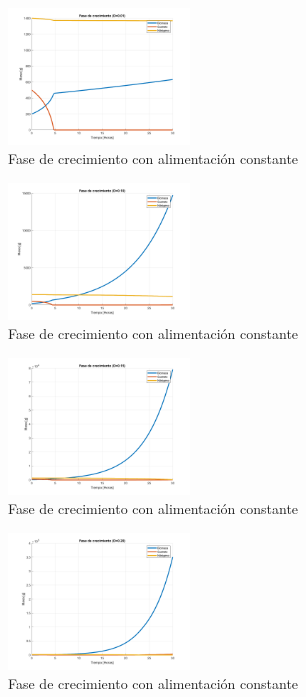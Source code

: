 \documentclass[letterpaper, 10 pt, conference]{ieeeconf}  %
\begin{document}
\begin{figure}[H]
  \centering
  \includegraphics[width=0.43\textwidth]{./Images_tp1/D1_growth_complete_1.png}
  \caption{Fase de crecimiento con alimentación constante}
\end{figure}
\begin{figure}[H]
  \centering
  \includegraphics[width=0.43\textwidth]{./Images_tp1/D1_growth_complete_2.png}
  \caption{Fase de crecimiento con alimentación constante}
\end{figure}
\begin{figure}[H]
  \centering
  \includegraphics[width=0.43\textwidth]{./Images_tp1/D1_growth_complete_3.png}
  \caption{Fase de crecimiento con alimentación constante}
\end{figure}
\begin{figure}[H]
  \centering
  \includegraphics[width=0.43\textwidth]{./Images_tp1/D1_growth_complete_4.png}
  \caption{Fase de crecimiento con alimentación constante}
\end{figure}
\end{document}
